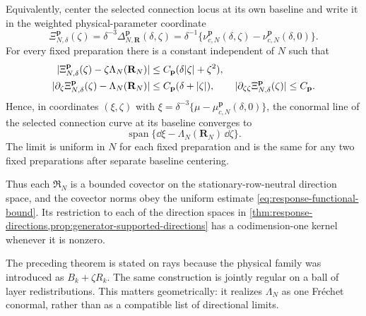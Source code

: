 \begin{theorem}
Equivalently, center the selected connection locus at its own baseline and
write it in the weighted physical-parameter coordinate
\begin{equation}
 \Xi^{\mathbf p}_{N,\delta}(\zeta)
 =\delta^{-3}\Delta^{\mathbf p}_{N,\mathbf R}(\delta,\zeta)
 =\delta^{-1}\{\nu^{\mathbf p}_{c,N}(\delta,\zeta)
                   -\nu^{\mathbf p}_{c,N}(\delta,0)\}.          \label{eq:model-weighted-connection-graph}
\end{equation}
For every fixed preparation there is a constant independent of \(N\) such
that
\begin{align}
 |\Xi^{\mathbf p}_{N,\delta}(\zeta)
       -\zeta\Lambda_N(\mathbf R_N)|
 &\le C_{\mathbf p}(\delta|\zeta|+\zeta^2),\notag\\
 |\partial_\zeta\Xi^{\mathbf p}_{N,\delta}(\zeta)
       -\Lambda_N(\mathbf R_N)|
 &\le C_{\mathbf p}(\delta+|\zeta|),\qquad
 |\partial_{\zeta\zeta}\Xi^{\mathbf p}_{N,\delta}(\zeta)|
 \le C_{\mathbf p}.                                  \label{eq:model-weighted-connection-bounds}
\end{align}
Hence, in coordinates \((\xi,\zeta)\) with
\(\xi=\delta^{-3}\{\mu-\mu^{\mathbf p}_{c,N}(\delta,0)\}\), the
conormal line of the selected connection curve at its baseline converges to
\begin{equation}
 \operatorname{span}\{\dd\xi
       -\Lambda_N(\mathbf R_N)\,\dd\zeta\}.          \label{eq:model-limiting-connection-conormal}
\end{equation}
The limit is uniform in \(N\) for each fixed preparation and is the same for
any two fixed preparations after separate baseline centering.

Thus each \(\mathfrak R_N\) is a bounded covector on the
stationary-row-neutral direction space, and the covector norms obey the
uniform estimate
\cref{eq:response-functional-bound}.  Its restriction to each of the
direction spaces in
\cref{thm:response-directions,prop:generator-supported-directions}
has a codimension-one kernel whenever it is nonzero.
\end{theorem}

The preceding theorem is stated on rays because the physical family was
introduced as \(B_k+\zeta R_k\).  The same construction is jointly regular
on a ball of layer redistributions.  This matters geometrically: it realizes
\(\Lambda_N\) as one Fr\'{e}chet conormal, rather than as a compatible list
of directional limits.

